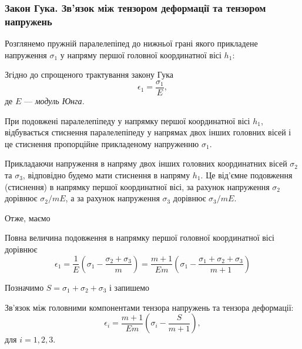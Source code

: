 \subsubsection{Закон Гука. Зв'язок між тензором деформації та тензором напружень}

Розглянемо пружній паралелепіпед до нижньої грані якого прикладене напруження $\sigma_1$ у напряму першої головної координатної вісі $h_1$:
\begin{figure}[H]
	\centering
\end{figure}

Згідно до спрощеного трактування закону Гука  
\begin{equation}
	\epsilon_1 = \frac{\sigma_1}{E},
\end{equation}
де $E$ --- \it{модуль Юнга}. \medskip

При подовжені паралелепіпеду у напрямку першої координатної вісі $h_1$, відбувається стиснення паралелепіпеду у напрямах двох інших головних вісей і це стиснення пропорційне прикладеному напруженню $\sigma_1$. \medskip

Прикладаючи напруження в напряму двох інших головних координатних вісей $\sigma_2$ та $\sigma_3$, відповідно будемо мати стиснення в напряму $h_1$. Це від'ємне подовження (стиснення) в напрямку першої координатної вісі, за рахунок напруження $\sigma_2$ дорівнює $\sigma_2 / m E$, а за рахунок напруження $\sigma_3$ дорівнює $\sigma_3 / m E$. \medskip

Отже, маємо 
\begin{law}
	Повна величина подовження в напрямку першої головної координатної вісі дорівнює
	\begin{equation}
		\epsilon_1 = \frac{1}{E} \left( \sigma_1 - \frac{\sigma_2 + \sigma_3}{m} \right) = \frac{m + 1}{E m} \left( \sigma_1 - \frac{\sigma_1 + \sigma_2 + \sigma_3}{m + 1} \right)
	\end{equation}
\end{law}

Позначимо $S = \sigma_1 + \sigma_2 + \sigma_3$ і запишемо 
\begin{law}
	Зв'язок між головними компонентами тензора напружень та тензора деформації:
	\begin{equation}
		\epsilon_i = \frac{m + 1}{E m} \left( \sigma_i - \frac{S}{m + 1} \right),
	\end{equation}
	для $i = 1, 2, 3$.
\end{law}

